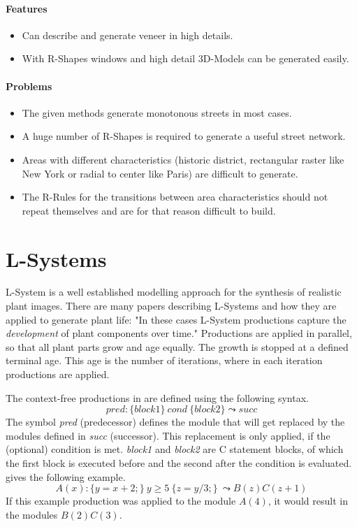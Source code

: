 \documentclass[11pt, a4paper]{report}
\begin{document}
\paragraph{Features}
    \begin{itemize}
        \item Can describe and generate veneer in high details.
        \item With R-Shapes windows and high detail 3D-Models can be generated easily.
    \end{itemize}

\paragraph{Problems}
    \begin{itemize}
        \item The given methods generate monotonous streets in most cases. 
        \item A huge number of R-Shapes is required to generate a useful street network.
        \item Areas with different characteristics (historic district, rectangular raster like New York or radial to center like Paris) are difficult to generate.
        \item The R-Rules for the transitions between area characteristics should not repeat themselves and are for that reason difficult to build.
    \end{itemize}

\pagebreak
\section{L-Systems}
L-System is a well established modelling approach for the synthesis of realistic plant images. There are many papers describing L-Systems and how they are applied to generate plant life: "In these cases L-System productions capture the \textit{development} of plant components over time." \citep{PrusinkiewiczEtAl:2001} Productions are applied in parallel, so that all plant parts grow and age equally. The growth is stopped at a defined terminal age. This age is the number of iterations, where in each iteration productions are applied.

The context-free productions in \citep{PrusinkiewiczEtAl:2001} are defined using the following syntax.
\begin{equation} \label{eq:lsystem context free}
    pred : \{block1\}\ cond\ \{block2\} \leadsto succ
\end{equation}
The symbol \textit{pred} (predecessor) defines the module that will get replaced by the modules defined in \textit{succ} (successor). This replacement is only applied, if the (optional) condition is met. \textit{block1} and \textit{block2} are C statement blocks, of which the first block is executed before and the second after the condition is evaluated. \citep{PrusinkiewiczEtAl:2001} gives the following example.
\begin{equation} \label{eq:lsystem example 1}
    A(x) : \{y = x + 2;\}\ y \geq 5\ \{z = y / 3;\}\ \leadsto B(z)C(z + 1)
\end{equation}
If this example production was applied to the module $A(4)$, it would result in the modules $B(2)C(3)$.
\end{document}
